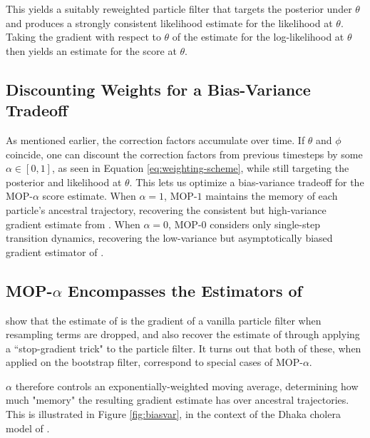 \documentclass[9pt,twocolumn,twoside]{pnas-new}
\begin{document}
This yields a suitably reweighted particle filter that targets the posterior under $\theta$ and produces a strongly consistent likelihood estimate for the likelihood at $\theta$. Taking the gradient with respect to $\theta$ of the estimate for the log-likelihood at $\theta$ then yields an estimate for the score at $\theta$. 




\subsection{Discounting Weights for a Bias-Variance Tradeoff}

As mentioned earlier, the correction factors accumulate over time. If $\theta$ and $\phi$ coincide, one can discount the correction factors from previous timesteps by some $\alpha \in [0,1]$, as seen in Equation \ref{eq:weighting-scheme}, while still targeting the posterior and likelihood at $\theta$. This lets us optimize a bias-variance tradeoff for the MOP-$\alpha$ score estimate. When $\alpha=1$, MOP-$1$ maintains the memory of each particle's ancestral trajectory, recovering the consistent but high-variance gradient estimate from \cite{poyiadjis11, scibior21}. When $\alpha=0$, MOP-$0$ considers only single-step transition dynamics, recovering the low-variance but asymptotically biased gradient estimator of \cite{naesseth18}. 


\subsection{MOP-$\alpha$ Encompasses the Estimators of \cite{poyiadjis11, scibior21, naesseth18}}

\cite{scibior21} show that the estimate of \cite{naesseth18} is the gradient of a vanilla particle filter when resampling terms are dropped, and also recover the estimate of \cite{poyiadjis11} through applying a ``stop-gradient trick" to the particle filter. It turns out that both of these, when applied on the bootstrap filter, correspond to special cases of MOP-$\alpha$.


$\alpha$ therefore controls an exponentially-weighted moving average, determining how much "memory" the resulting gradient estimate has over ancestral trajectories. This is illustrated in Figure \ref{fig:biasvar}, in the context of the Dhaka cholera model of \cite{king08}. 
\end{document}
